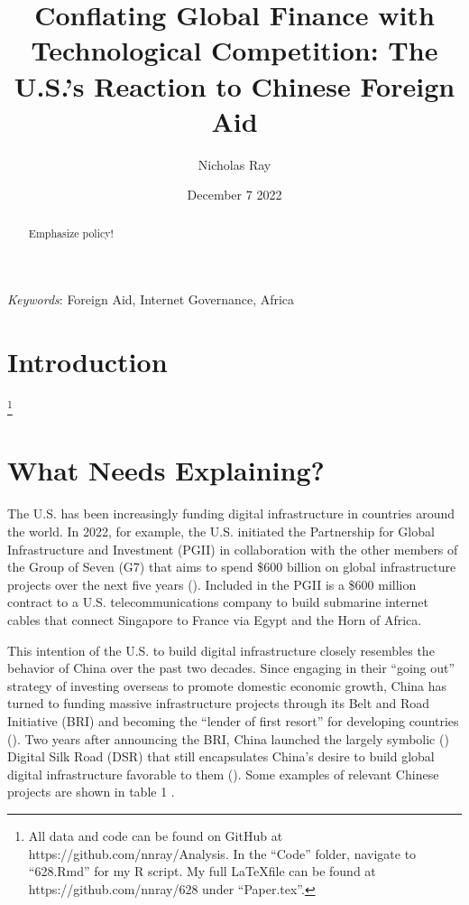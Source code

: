 \documentclass[12pt]{article}
\title{\vspace{-2.75cm}Conflating Global Finance with Technological Competition: The U.S.'s Reaction to Chinese Foreign Aid\vspace{-0.5cm}}
\author{Nicholas Ray}
\date{\vspace{-0.30cm}December 7 2022\vspace{-1cm}}
\begin{document}
\maketitle
\begin{abstract}
    Emphasize policy! \blindtext
\end{abstract}

\textit{Keywords}: Foreign Aid, Internet Governance, Africa

\section*{Introduction}
\footnote{All data and code can be found on GitHub at https://github.com/nnray/Analysis. In the ``Code'' folder, navigate to ``628.Rmd'' for my R script. My full \LaTeX \;file can be found at https://github.com/nnray/628 under ``Paper.tex''.}

\section*{What Needs Explaining?}
The U.S. has been increasingly funding digital infrastructure in countries around the world. In 2022, for example, the U.S. initiated the Partnership for Global Infrastructure and Investment (PGII) in collaboration with the other members of the Group of Seven (G7) that aims to spend \$600 billion on global infrastructure projects over the next five years (\cite{thewhitehouse2022}). Included in the PGII is a \$600 million contract to a U.S. telecommunications company to build submarine internet cables that connect Singapore to France via Egypt and the Horn of Africa. %

This intention of the U.S. to build digital infrastructure closely resembles the behavior of China over the past two decades. Since engaging in their ``going out'' strategy of investing overseas to promote domestic economic growth, China has turned to funding massive infrastructure projects through its Belt and Road Initiative (BRI) and becoming the ``lender of first resort'' for developing countries (\parencite[1]{dreher2022}). Two years after announcing the BRI, China launched the largely symbolic (\cite{tugendhat2021}) Digital Silk Road (DSR) that still encapsulates China's desire to build global digital infrastructure favorable to them (\cite{shen2022}). Some examples of relevant Chinese projects are shown in table 1 \nocite{agbebi2022}.
\end{document}
